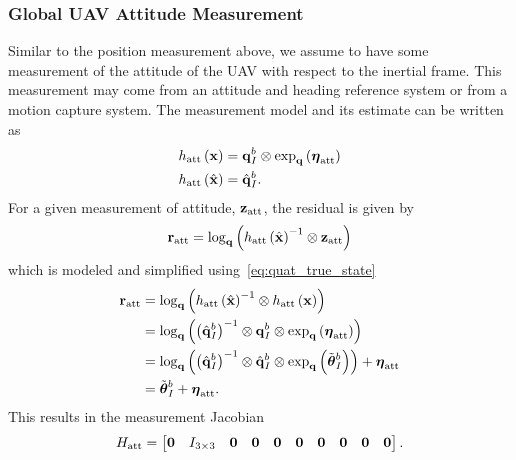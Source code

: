 
\subsubsection{Global UAV Attitude Measurement}
Similar to the position measurement above, we assume to have some measurement of
the attitude of the UAV with respect to the inertial frame. This measurement may
come from an attitude and heading reference system or from a motion
capture system. 
The measurement model and its estimate can
be written as
\begin{align}
  h_{\text{att}} \left( \boldsymbol{\mathrm{x}} \right) &= \boldsymbol{\mathrm{q}}_{I}^b \otimes \exp_{\boldsymbol{\mathrm{q}}} \left(
  \boldsymbol{\mathrm{\eta}}_{\text{att}} \right) \\
    h_{\text{att}} \left( \hat{\boldsymbol{\mathrm{x}}} \right) &= \hat{\boldsymbol{\mathrm{q}}}_{I}^b.
\end{align}
For a given measurement of attitude, $\boldsymbol{\mathrm{z}}_{\text{att}}$, the residual is
given by
\begin{equation}
  \boldsymbol{\mathrm{r}}_{\text{att}} = \log_{\boldsymbol{\mathrm{q}}} \left(  h_{\text{att}} \left(
  \hat{\boldsymbol{\mathrm{x}}} \right)^{-1} \otimes \boldsymbol{\mathrm{z}}_{\text{att}} \right)
\end{equation}
which is modeled and simplified using~\eqref{eq:quat_true_state}
\begin{align}
  \boldsymbol{\mathrm{r}}_{\text{att}} &= \log_{\boldsymbol{\mathrm{q}}} \left(  h_{\text{att}} \left(
  \hat{\boldsymbol{\mathrm{x}}} \right)^{-1} \otimes h_{\text{att}} \left( \boldsymbol{\mathrm{x}} \right) \right) \\
                        &= \log_{\boldsymbol{\mathrm{q}}} \left(  \left(
  \hat{\boldsymbol{\mathrm{q}}}_{I}^b \right)^{-1} \otimes \boldsymbol{\mathrm{q}}_{I}^b \otimes \exp_{\boldsymbol{\mathrm{q}}} \left(
  \boldsymbol{\mathrm{\eta}}_{\text{att}} \right)\right) \\
                        &= \log_{\boldsymbol{\mathrm{q}}} \left(  \left(
                        \hat{\boldsymbol{\mathrm{q}}}_{I}^b \right)^{-1} \otimes
                        \hat{\boldsymbol{\mathrm{q}}}_{I}^b \otimes \exp_{\boldsymbol{\mathrm{q}}} \left(
                      \tilde{\boldsymbol{\mathrm{\theta}}}_I^b \right) \right)
                          + \boldsymbol{\mathrm{\eta}}_{\text{att}}  \\
                        &= \tilde{\boldsymbol{\mathrm{\theta}}}_I^b
                          + \boldsymbol{\mathrm{\eta}}_{\text{att}}. 
\end{align}
This results in the measurement Jacobian
\begin{equation}
  H_{\text{att}} =
  \begin{bmatrix}
    \boldsymbol{\mathrm{0}} & I_{3 \times 3} & \boldsymbol{\mathrm{0}} & \boldsymbol{\mathrm{0}} & \boldsymbol{\mathrm{0}} & \boldsymbol{\mathrm{0}} & \boldsymbol{\mathrm{0}} & \boldsymbol{\mathrm{0}} & \boldsymbol{\mathrm{0}} & \boldsymbol{\mathrm{0}}
  \end{bmatrix}.
\end{equation}

